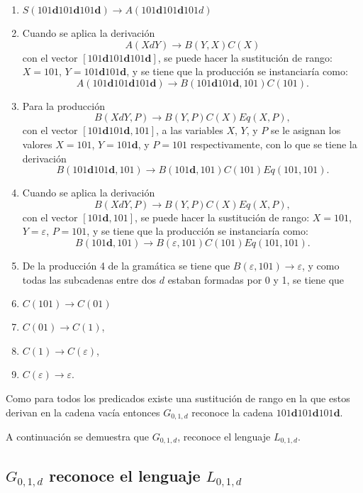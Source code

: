 \begin{enumerate}
    \item $S(101\mathbf{d}101\mathbf{d}101\mathbf{d}) \to A(101\mathbf{d}101\mathbf{d}101d)$
    \item Cuando se aplica la derivación
          $$A(XdY)\to B(Y,X)C(X)$$
          con el vector  $[101\mathbf{d}101\mathbf{d}101\mathbf{d}]$, se puede hacer la sustitución de rango: $X=101$, $Y=101\mathbf{d}101\mathbf{d}$, y se tiene que la producción se instanciaría como:
          $$A(101\mathbf{d}101\mathbf{d}101\mathbf{d}) \to B(101\mathbf{d}101\mathbf{d},101)C(101).$$
    \item Para la producción $$B(XdY,P)\to B(Y,P) C(X) Eq(X,P),$$
          con el vector $[101\mathbf{d}101\mathbf{d},101]$, a las variables $X$, $Y$, y $P$ se le asignan los valores $X=101$, $Y=101\mathbf{d}$, y $P=101$ respectivamente, con lo que se tiene la derivación 
          $$B(101\mathbf{d}101\mathbf{d},101) \to B(101\mathbf{d},101)C(101)Eq(101,101).$$
    \item Cuando se aplica la derivación
          $$B(XdY,P)\to B(Y,P) C(X) Eq(X,P),$$
          con el vector $[101\mathbf{d},101]$, se puede hacer la sustitución de rango: $X=101$, $Y=\varepsilon$, $P=101$, y se tiene que la producción se instanciaría como:
          $$B(101\mathbf{d},101) \to B(\varepsilon,101)C(101)Eq(101,101).$$
    \item De la producción 4 de la gramática se tiene que $B(\varepsilon,101) \to \varepsilon$, y como todas las subcadenas entre dos $d$ estaban formadas por 0 y 1, se tiene que
    \item $C(101)\to C(01)$
    \item $C(01)\to C(1)$,
    \item $C(1)\to C(\varepsilon)$,
    \item $C(\varepsilon)\to \varepsilon$.
\end{enumerate}

Como para todos los predicados existe una sustitución de rango en la que estos derivan en la cadena vacía entonces  $G_{0,1,d}$ reconoce la cadena $101\mathbf{d}101\mathbf{d}101\mathbf{d}$.

A continuación se demuestra que $G_{0,1,d}$, reconoce el lenguaje $L_{0,1,d}$.

\subsection{$G_{0,1,d}$ reconoce el lenguaje $L_{0,1,d}$}
\label{sec:demg01d}

